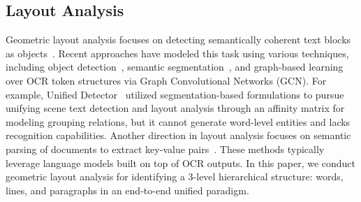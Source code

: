 \subsection{Layout Analysis}
Geometric layout analysis focuses on detecting semantically coherent text blocks as objects~\cite{zhong2019publaynet,long2022towards,hts}. Recent approaches have modeled this task using various techniques, including object detection~\cite{Schreiber2017DeepDeSRTDL}, semantic segmentation~\cite{long2022towards}, and graph-based learning over OCR token structures via Graph Convolutional Networks (GCN). For example, Unified Detector~\cite{long2022towards} utilized segmentation-based formulations to pursue unifying scene text detection and layout analysis through an affinity matrix for modeling grouping relations, but it cannot generate word-level entities and lacks recognition capabilities. Another direction in layout analysis focuses on semantic parsing of documents to extract key-value pairs~\cite{li2021structurallm,long2022towards}. These methods typically leverage language models built on top of OCR outputs. In this paper, we conduct geometric layout analysis for identifying a 3-level hierarchical structure: words, lines, and paragraphs in an end-to-end unified paradigm.

